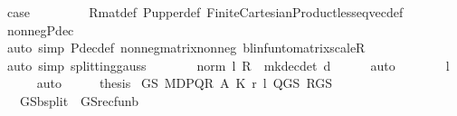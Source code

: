 \begin{isabellebody}
\ {\isacharquery}{\kern0pt}case\ \isanewline
\ \ \ \ \ \ \isamarkupfalse%
\ R{\isacharunderscore}{\kern0pt}mat{\isacharunderscore}{\kern0pt}def\ P{\isacharunderscore}{\kern0pt}upper{\isacharunderscore}{\kern0pt}def\ Finite{\isacharunderscore}{\kern0pt}Cartesian{\isacharunderscore}{\kern0pt}Product{\isachardot}{\kern0pt}less{\isacharunderscore}{\kern0pt}eq{\isacharunderscore}{\kern0pt}vec{\isacharunderscore}{\kern0pt}def\isanewline
\ \ \ \ \ \ \isamarkupfalse%
\ nonneg{\isacharunderscore}{\kern0pt}P{\isacharunderscore}{\kern0pt}dec\ \isanewline
\ \ \ \ \ \ \isamarkupfalse%
\ {\isacharparenleft}{\kern0pt}auto\ simp{\isacharcolon}{\kern0pt}\ P{\isacharunderscore}{\kern0pt}dec{\isacharunderscore}{\kern0pt}def\ nonneg{\isacharunderscore}{\kern0pt}matrix{\isacharunderscore}{\kern0pt}nonneg\ blinfun{\isacharunderscore}{\kern0pt}to{\isacharunderscore}{\kern0pt}matrix{\isacharunderscore}{\kern0pt}scaleR{\isacharparenright}{\kern0pt}\isanewline
\ \ \isamarkupfalse%
\ {\isacharparenleft}{\kern0pt}auto\ simp{\isacharcolon}{\kern0pt}\ splitting{\isacharunderscore}{\kern0pt}gauss{\isacharparenright}{\kern0pt}\isanewline
\ \ \isamarkupfalse%
\ \isamarkupfalse%
\ {\isachardoublequoteopen}{\isasymdots}\ {\isacharequal}{\kern0pt}\ norm\ {\isacharparenleft}{\kern0pt}{\isacharparenleft}{\kern0pt}l\ {\isacharasterisk}{\kern0pt}\isactrlsub R\ {\isasymP}\ {\isacharparenleft}{\kern0pt}mk{\isacharunderscore}{\kern0pt}dec{\isacharunderscore}{\kern0pt}det\ d{\isacharparenright}{\kern0pt}{\isacharparenright}{\kern0pt}{\isacharparenright}{\kern0pt}{\isachardoublequoteclose}\isanewline
\ \ \ \ \isamarkupfalse%
\ auto\isanewline
\ \ \isamarkupfalse%
\ \isamarkupfalse%
\ {\isachardoublequoteopen}{\isasymdots}\ {\isasymle}\ l{\isachardoublequoteclose}\isanewline
\ \ \ \ \isamarkupfalse%
\ auto\isanewline
\ \ \isamarkupfalse%
\ \isamarkupfalse%
\ {\isacharquery}{\kern0pt}thesis\isacommand{{\isachardot}{\kern0pt}}\isamarkupfalse%
\isanewline
{}\isamarkupfalse%
%
\endisatagproof
{\isafoldproof}%
%
\isadelimproof
\isanewline
%
\endisadelimproof
\isanewline
{}\isamarkupfalse%
\ GS{\isacharcolon}{\kern0pt}\ MDP{\isacharunderscore}{\kern0pt}QR\ A\ K\ r\ l\ Q{\isacharunderscore}{\kern0pt}GS\ R{\isacharunderscore}{\kern0pt}GS\isanewline
\ \ \ {\isachardoublequoteopen}GS{\isachardot}{\kern0pt}{\isasymL}\isactrlsub b{\isacharunderscore}{\kern0pt}split\ {\isacharequal}{\kern0pt}\ GS{\isacharunderscore}{\kern0pt}rec{\isacharunderscore}{\kern0pt}fun\isactrlsub b{\isachardoublequoteclose}\isanewline

\end{isabellebody}
